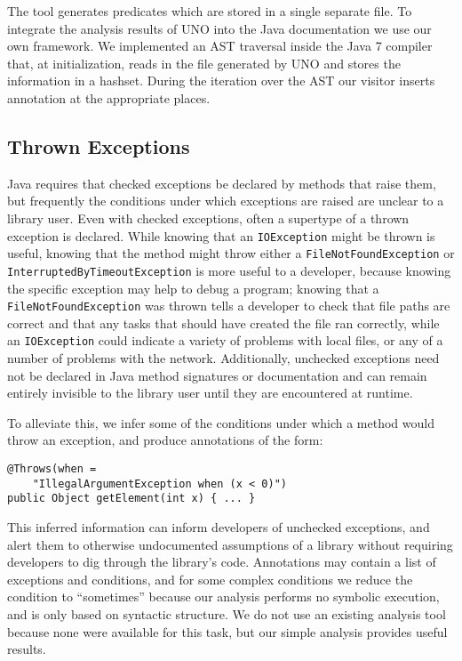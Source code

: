 The tool generates predicates which are stored in a single separate file. 
To integrate the analysis results of UNO into the Java documentation we
use our own framework. We implemented an AST traversal inside the Java 7 
compiler that, at initialization, reads in the file generated by UNO and 
stores the information in a hashset. During the iteration over the AST
our visitor inserts annotation at the appropriate places.

\subsection{Thrown Exceptions}

Java requires that checked exceptions be declared by methods that raise them,
but frequently the conditions under which exceptions are raised are unclear to a
library user. Even with checked exceptions, often a supertype of a thrown
exception is declared.  While knowing that an \texttt{IOException} might be
thrown is useful, knowing that the method might throw either a
\texttt{FileNotFoundException} or \texttt{InterruptedByTimeoutException} is more
useful to a developer, because knowing the specific exception may help to debug
a program; knowing that a \texttt{FileNotFoundException} was thrown tells a
developer to check that file paths are correct and that any tasks that should
have created the file ran correctly, while an \texttt{IOException} could
indicate a variety of problems with local files, or any of a number of problems
with the network.  Additionally, unchecked exceptions need not be declared in Java method
signatures or documentation and can remain entirely invisible to the library
user until they are encountered at runtime.

To alleviate this, we infer some of the conditions under which a method would
throw an exception, and produce annotations of the form:

\begin{verbatim}
@Throws(when =
    "IllegalArgumentException when (x < 0)")
public Object getElement(int x) { ... }
\end{verbatim}

This inferred information can inform developers of unchecked exceptions,
and alert them to otherwise undocumented assumptions of a library without
requiring developers to dig through the library's code.
Annotations may contain a list of exceptions and conditions, and for some
complex conditions we reduce the condition to ``sometimes'' because our analysis
performs no symbolic execution, and is only based on syntactic structure.  We do not use an
existing analysis tool because none were available for this task, but our
simple analysis provides useful results.

